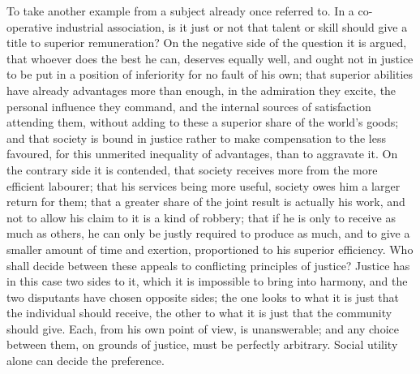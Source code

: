 \documentclass[12pt]{report}
\begin{document}
To take another example from a subject already once referred to. In a co-operative industrial association, is it just or not that talent or skill should give a title to superior remuneration? On the negative side of the question it is argued, that whoever does the best he can, deserves equally well, and ought not in justice to be put in a position of inferiority for no fault of his own; that superior abilities have already advantages more than enough, in the admiration they excite, the personal influence they command, and the internal sources of satisfaction attending them, without adding to these a superior share of the world's goods; and that society is bound in justice rather to make compensation to the less favoured, for this unmerited inequality of advantages, than to aggravate it. On the contrary side it is contended, that society receives more from the more efficient labourer; that his services being more useful, society owes him a larger return for them; that a greater share of the joint result is actually his work, and not to allow his claim to it is a kind of robbery; that if he is only to receive as much as others, he can only be justly required to produce as much, and to give a smaller amount of time and exertion, proportioned to his superior efficiency. Who shall decide between these appeals to conflicting principles of justice? Justice has in this case two sides to it, which it is impossible to bring into harmony, and the two disputants have chosen opposite sides; the one looks to what it is just that the individual should receive, the other to what it is just that the community should give. Each, from his own point of view, is unanswerable; and any choice between them, on grounds of justice, must be perfectly arbitrary. Social utility alone can decide the preference.
\end{document}
